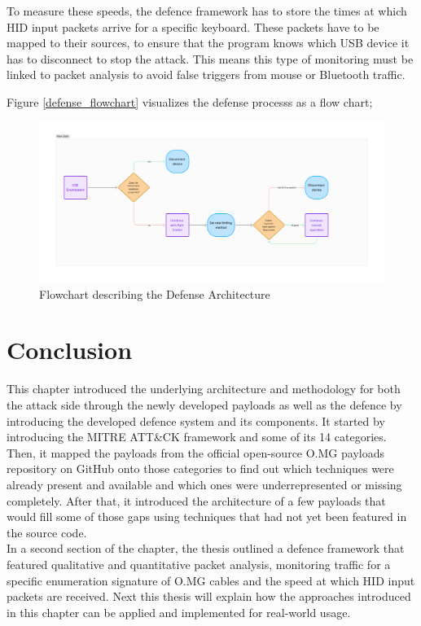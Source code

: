 To measure these speeds, the defence framework has to store the times at which HID input packets arrive for a specific keyboard. These packets have to be mapped to their sources, to ensure that the program knows which USB device it has to disconnect to stop the attack. This means this type of monitoring must be linked to packet analysis to avoid false triggers from mouse or Bluetooth traffic.

Figure \ref{defense_flowchart} visualizes the defense processs as a flow chart; 

\begin{figure}[H]
    \centering
    \includegraphics[width=0.75\linewidth]{visuals/defense_flowchart.png}
    \caption{Flowchart describing the Defense Architecture}
    \label{fig:defense_flowchart}
\end{figure}


\section{Conclusion}

This chapter introduced the underlying architecture and methodology for both the attack side through the newly developed payloads as well as the defence by introducing the developed defence system and its components. 
It started by introducing the MITRE ATT\&CK framework and some of its 14 categories. Then, it mapped the payloads from the official open-source O.MG payloads repository on GitHub onto those categories to find out which techniques were already present and available and which ones were underrepresented or missing completely. After that, it introduced the architecture of a few payloads that would fill some of those gaps using techniques that had not yet been featured in the source code. \\
In a second section of the chapter, the thesis outlined a defence framework that featured qualitative and quantitative packet analysis, monitoring traffic for a specific enumeration signature of O.MG cables and the speed at which HID input packets are received. Next this thesis will explain how the approaches introduced in this chapter can be applied and implemented for real-world usage. 



